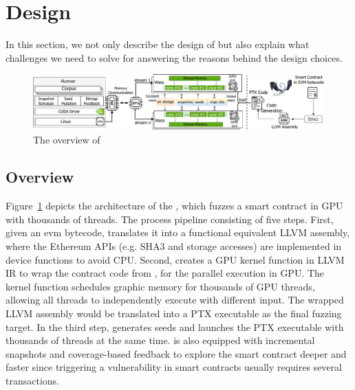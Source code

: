 \section{Design}
In this section, we not only describe the design of  {\tool} but also explain what challenges we need to solve for answering the reasons behind the design choices.  

\begin{figure}[t]
\centerline{\includegraphics[width=\textwidth]{images/GFL-overview.drawio.pdf}}
\caption{The overview of {\tool}}
\vspace{-0.1in}
\label{fig:overview}
\end{figure}


\subsection{Overview}
Figure~\ref{fig:overview} depicts the architecture of the {\tool}, which fuzzes a smart contract in GPU with thousands of threads.  
%
The process pipeline consisting of five steps. 
%
First, given an evm bytecode, {\translator} translates it into a functional equivalent LLVM assembly, where the Ethereum APIs (e.g. SHA3 and storage accesses) are implemented in device functions to avoid CPU.
%
Second, {\wrapper} creates a GPU kernel function in LLVM IR to wrap the contract code from {\translator}, for the parallel execution in GPU. The kernel function schedules graphic memory for thousands of GPU threads, allowing all threads to independently execute with different input. The wrapped LLVM assembly would be translated into a PTX executable as the final fuzzing target. 
%
In the third step, {\runner} generates seeds and launches the PTX executable with thousands of threads at the same time. {\runner} is also equipped with incremental snapshots and coverage-based feedback to explore the smart contract deeper and faster since triggering a vulnerability in smart contracts usually requires several transactions\cite{TBD}. 

